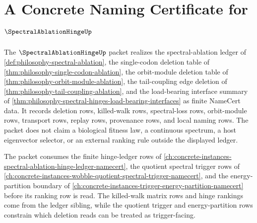 \chapter{A Concrete Naming Certificate for $\SpectralAblationHingeUp$}
\label{ch:concrete-instances-spectral-ablation-hinge-namecert}

The $\SpectralAblationHingeUp$ packet realizes the spectral-ablation ledger of \autoref{def:philosophy-spectral-ablation}, the single-codon deletion table of \autoref{thm:philosophy-single-codon-ablation}, the orbit-module deletion table of \autoref{thm:philosophy-orbit-module-ablation}, the tail-coupling edge deletion of \autoref{thm:philosophy-tail-coupling-ablation}, and the load-bearing interface summary of \autoref{thm:philosophy-spectral-hinges-load-bearing-interfaces} as finite NameCert data. It records deletion rows, killed-walk rows, spectral-loss rows, orbit-module rows, transport rows, replay rows, provenance rows, and local naming rows. The packet does not claim a biological fitness law, a continuous spectrum, a host eigenvector selector, or an external ranking rule outside the displayed ledger.

The packet consumes the finite hinge-ledger rows of \autoref{ch:concrete-instances-spectral-ablation-hinge-ledger-namecert}, the quotient spectral trigger rows of \autoref{ch:concrete-instances-wobble-quotient-spectral-trigger-namecert}, and the energy-partition boundary of \autoref{ch:concrete-instances-trigger-energy-partition-namecert} before its ranking row is read. The killed-walk matrix rows and hinge rankings come from the ledger sibling, while the quotient trigger and energy-partition rows constrain which deletion reads can be treated as trigger-facing.


